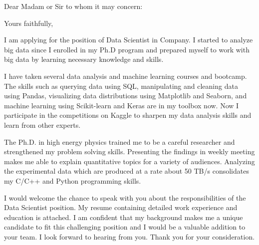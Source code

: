 \documentclass[12pt,letterpaper]{moderncv}   %
\newcommand{\CompanyName}{Company}
\newcommand{\CompanyAddress}{San Francisco, CA}
\newcommand{\JobPositionName}{Data Scientist}
\newcommand{\ManagerName}{Madam or Sir to whom it may concern:}
\newcommand{\ClosingWords}{Yours faithfully,} %
\begin{document}
%
%

\recipient{\CompanyName{}}{\CompanyAddress{}}
\date{\today}
\opening{Dear \ManagerName{}}
\closing{\ClosingWords}
\makelettertitle

%
%
\justifying

I am applying for the position of \JobPositionName{} in \CompanyName{}.
I started to analyze big data since I enrolled in my Ph.D program and prepared myself to work with big data by learning necessary knowledge and skills.

I have taken several data analysis and machine learning courses and bootcamp.
The skills such as querying data using SQL, manipulating and cleaning data using Pandas, visualizing data distributions using Matplotlib and Seaborn, and machine learning using Scikit-learn and Keras are in my toolbox now.
Now I participate in the competitions on Kaggle to sharpen my data analysis skills and learn from other experts.

The Ph.D. in high energy physics trained me to be a careful researcher and strengthened my problem solving skills.
Presenting the findings in weekly meeting makes me able to explain quantitative topics for a variety of audiences.
Analyzing the experimental data which are produced at a rate about 50 TB/s consolidates my C/C++ and Python programming skills.

I would welcome the chance to speak with you about the responsibilities of the \JobPositionName{} position.
My resume containing detailed work experience and education is attached.
I am confident that my background makes me a unique candidate to fit this challenging position and I would be a valuable addition to your team.
I look forward to hearing from you.
Thank you for your consideration.

\vspace{0.5cm}

\makeletterclosing
\end{document}
